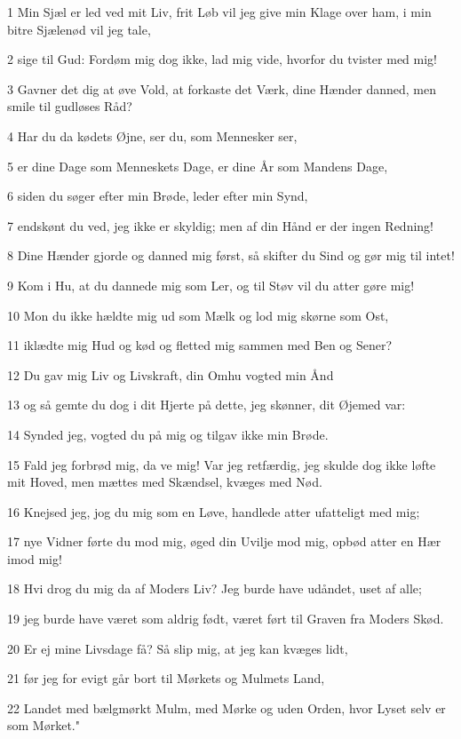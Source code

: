 \par 1 Min Sjæl er led ved mit Liv, frit Løb vil jeg give min Klage over ham, i min bitre Sjælenød vil jeg tale,
\par 2 sige til Gud: Fordøm mig dog ikke, lad mig vide, hvorfor du tvister med mig!
\par 3 Gavner det dig at øve Vold, at forkaste det Værk, dine Hænder danned, men smile til gudløses Råd?
\par 4 Har du da kødets Øjne, ser du, som Mennesker ser,
\par 5 er dine Dage som Menneskets Dage, er dine År som Mandens Dage,
\par 6 siden du søger efter min Brøde, leder efter min Synd,
\par 7 endskønt du ved, jeg ikke er skyldig; men af din Hånd er der ingen Redning!
\par 8 Dine Hænder gjorde og danned mig først, så skifter du Sind og gør mig til intet!
\par 9 Kom i Hu, at du dannede mig som Ler, og til Støv vil du atter gøre mig!
\par 10 Mon du ikke hældte mig ud som Mælk og lod mig skørne som Ost,
\par 11 iklædte mig Hud og kød og fletted mig sammen med Ben og Sener?
\par 12 Du gav mig Liv og Livskraft, din Omhu vogted min Ånd
\par 13 og så gemte du dog i dit Hjerte på dette, jeg skønner, dit Øjemed var:
\par 14 Synded jeg, vogted du på mig og tilgav ikke min Brøde.
\par 15 Fald jeg forbrød mig, da ve mig! Var jeg retfærdig, jeg skulde dog ikke løfte mit Hoved, men mættes med Skændsel, kvæges med Nød.
\par 16 Knejsed jeg, jog du mig som en Løve, handlede atter ufatteligt med mig;
\par 17 nye Vidner førte du mod mig, øged din Uvilje mod mig, opbød atter en Hær imod mig!
\par 18 Hvi drog du mig da af Moders Liv? Jeg burde have udåndet, uset af alle;
\par 19 jeg burde have været som aldrig født, været ført til Graven fra Moders Skød.
\par 20 Er ej mine Livsdage få? Så slip mig, at jeg kan kvæges lidt,
\par 21 før jeg for evigt går bort til Mørkets og Mulmets Land,
\par 22 Landet med bælgmørkt Mulm, med Mørke og uden Orden, hvor Lyset selv er som Mørket."

